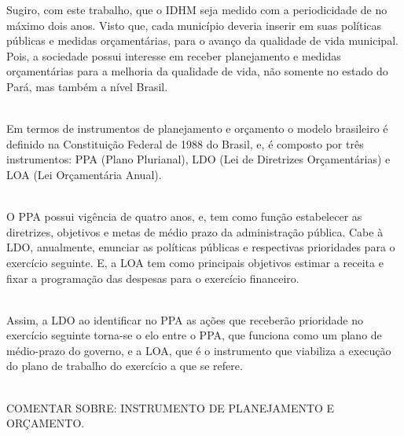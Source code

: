 \documentclass[a4paper, 10pt]{article}
\begin{document}
 Sugiro, com este trabalho, que o IDHM seja medido com a periodicidade de no máximo dois anos. Visto que, cada município deveria inserir em suas políticas públicas e medidas orçamentárias, para o avanço da qualidade de vida municipal.  Pois, a sociedade possui interesse em receber planejamento e medidas orçamentárias para a melhoria da qualidade de vida, não somente no estado do Pará, mas também a nível Brasil. 
 
 \\
 
 Em termos de instrumentos de planejamento e orçamento o modelo brasileiro é definido na Constituição Federal de 1988 do Brasil, e, é composto por três instrumentos:  PPA (Plano Plurianal), LDO (Lei de Diretrizes Orçamentárias) e LOA (Lei Orçamentária Anual).
 
 \\
 
 O PPA possui vigência de quatro anos, e, tem como função estabelecer as diretrizes, objetivos e metas de médio prazo da administração pública. Cabe à LDO, anualmente, enunciar as políticas públicas e respectivas prioridades para o exercício seguinte. E, a LOA tem como principais objetivos estimar a receita e fixar a programação das despesas para o exercício financeiro.
 
 \\
 Assim, a LDO ao identificar no PPA as ações que receberão prioridade no exercício seguinte torna-se o elo entre o PPA, que funciona como um plano de médio-prazo do governo, e a LOA, que é o instrumento que viabiliza a execução do plano de trabalho do exercício a que se refere.
 
 \\
 COMENTAR SOBRE:  INSTRUMENTO DE PLANEJAMENTO E ORÇAMENTO.
\\
\newpage
     
       \large
\end{document}
